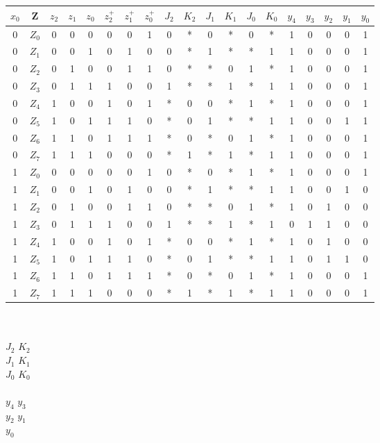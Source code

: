 \documentclass[11pt,a4paper]{article}
\begin{document}
\begin{tabular}{c | c | c | c | c | | c | c | c | | c | c | c | c | c | c | | c | c | c | c | c}
$x_0$&Z&$z_2$&$z_1$&$z_0$&$z^+_2$&$z^+_1$&$z^+_0$&$J_2$&$K_2$&$J_1$&$K_1$&$J_0$&$K_0$&$y_4$&$y_3$&$y_2$&$y_1$&$y_0$ \\ \hline
0&$Z_0$&0&0&0&0&0&1&0&*&0&*&0&*&1&0&0&0&1\\
0&$Z_1$&0&0&1&0&1&0&0&*&1&*&*&1&1&0&0&0&1\\
0&$Z_2$&0&1&0&0&1&1&0&*&*&0&1&*&1&0&0&0&1\\
0&$Z_3$&0&1&1&1&0&0&1&*&*&1&*&1&1&0&0&0&1\\
0&$Z_4$&1&0&0&1&0&1&*&0&0&*&1&*&1&0&0&0&1\\
0&$Z_5$&1&0&1&1&1&0&*&0&1&*&*&1&1&0&0&1&1\\
0&$Z_6$&1&1&0&1&1&1&*&0&*&0&1&*&1&0&0&0&1\\
0&$Z_7$&1&1&1&0&0&0&*&1&*&1&*&1&1&0&0&0&1\\ \hline
1&$Z_0$&0&0&0&0&0&1&0&*&0&*&1&*&1&0&0&0&1\\
1&$Z_1$&0&0&1&0&1&0&0&*&1&*&*&1&1&0&0&1&0\\
1&$Z_2$&0&1&0&0&1&1&0&*&*&0&1&*&1&0&1&0&0\\
1&$Z_3$&0&1&1&1&0&0&1&*&*&1&*&1&0&1&1&0&0\\
1&$Z_4$&1&0&0&1&0&1&*&0&0&*&1&*&1&0&1&0&0\\
1&$Z_5$&1&0&1&1&1&0&*&0&1&*&*&1&1&0&1&1&0\\
1&$Z_6$&1&1&0&1&1&1&*&0&*&0&1&*&1&0&0&0&1\\
1&$Z_7$&1&1&1&0&0&0&*&1&*&1&*&1&1&0&0&0&1\\
\end{tabular}\\ \\
$J_2$ 
 $K_2$
\\
$J_1$
$K_1$
\\
$J_0$
$K_0$
\\ \\
$y_4$
$y_3$
\\
$y_2$
$y_1$
\\
$y_0$
\\
\end{document}
